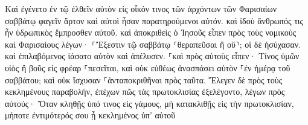 \documentclass{openreader}
\begin{document}
Καὶ ἐγένετο ἐν τῷ ἐλθεῖν αὐτὸν εἰς οἶκόν τινος τῶν ἀρχόντων τῶν Φαρισαίων σαββάτῳ φαγεῖν ἄρτον καὶ αὐτοὶ ἦσαν παρατηρούμενοι αὐτόν. 
καὶ ἰδοὺ ἄνθρωπός τις ἦν ὑδρωπικὸς ἔμπροσθεν αὐτοῦ. 
καὶ ἀποκριθεὶς ὁ Ἰησοῦς εἶπεν πρὸς τοὺς νομικοὺς καὶ Φαρισαίους λέγων· ⸀Ἔξεστιν τῷ σαββάτῳ ⸂θεραπεῦσαι ἢ οὔ⸃; 
οἱ δὲ ἡσύχασαν. καὶ ἐπιλαβόμενος ἰάσατο αὐτὸν καὶ ἀπέλυσεν. 
⸀καὶ πρὸς αὐτοὺς εἶπεν· Τίνος ὑμῶν υἱὸς ἢ βοῦς εἰς φρέαρ ⸀πεσεῖται, καὶ οὐκ εὐθέως ἀνασπάσει αὐτὸν ⸀ἐν ἡμέρᾳ τοῦ σαββάτου; 
καὶ οὐκ ἴσχυσαν ⸀ἀνταποκριθῆναι πρὸς ταῦτα. 
Ἔλεγεν δὲ πρὸς τοὺς κεκλημένους παραβολήν, ἐπέχων πῶς τὰς πρωτοκλισίας ἐξελέγοντο, λέγων πρὸς αὐτούς· 
Ὅταν κληθῇς ὑπό τινος εἰς γάμους, μὴ κατακλιθῇς εἰς τὴν πρωτοκλισίαν, μήποτε ἐντιμότερός σου ᾖ κεκλημένος ὑπ’ αὐτοῦ 
\end{document}
